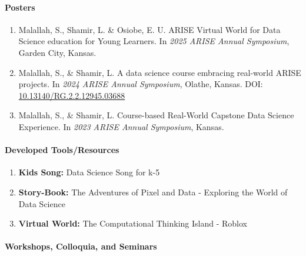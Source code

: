 \documentclass[11pt]{article}
\begin{document}
\paragraph{Posters}
\begin{enumerate}
\item Malallah, S., Shamir, L. \& Osiobe, E. U.  ARISE Virtual World for Data Science education for Young Learners. In \textit{2025 ARISE Annual Symposium},  Garden City, Kansas. 

\item Malallah, S., \& Shamir, L. A data science course embracing real-world ARISE projects. In \textit{2024 ARISE Annual Symposium}, Olathe, Kansas. DOI: \href{https://doi.org/10.13140/RG.2.2.12945.03688}{10.13140/RG.2.2.12945.03688}

\item Malallah, S., \& Shamir, L. Course-based Real-World Capstone Data Science Experience. In \textit{2023 ARISE Annual Symposium}, Kansas. 

\end{enumerate}



\paragraph{Developed Tools/Resources}
\begin{enumerate}

\item \textbf{Kids Song:} Data Science Song for k-5 {\href{https://youtu.be/rWBXU5AKYD8}{\color{icnclr} \faGlobe[regular] }}


\item \textbf{Story-Book:} The Adventures of Pixel and Data - Exploring the World of Data Science {\href{https://ksuemailprod-my.sharepoint.com/:b:/g/personal/safia_ksu_edu/EW9xrdxy7OBAv6AwFqtaiYUBiEwCSDBC7tKysdEAw_IyCw?e=eJRkrW}{\color{icnclr} \faGlobe[regular] }}

\item \textbf{Virtual World:} The Computational Thinking Island - Roblox  {\href{https://www.roblox.com/games/6791204917/CT-Island}{\color{icnclr} \faGlobe[regular] }}


\end{enumerate}



\paragraph{Workshops, Colloquia, and Seminars}
\end{document}
